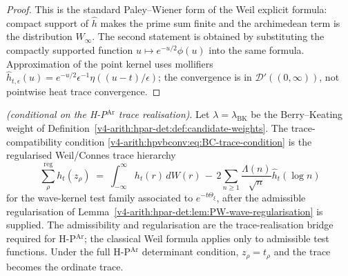 \begin{proof}
This is the standard Paley--Wiener form of the Weil explicit formula:
compact support of \(\widehat h\) makes the prime sum finite and the
archimedean term is the distribution \(W_{\infty}\). The second
statement is obtained by substituting the compactly supported function
\(u\mapsto e^{-u/2}\phi(u)\) into the same formula. Approximation of
the point kernel uses mollifiers
\(\widehat h_{t,\epsilon}(u)=e^{-u/2}\epsilon^{-1}\eta((u-t)/\epsilon)\);
the convergence is in \(\mathcal D'((0,\infty))\), not pointwise heat
trace convergence.
\end{proof}

\begin{theorem}
\label{v4-arith:hpar-det:thm:hierarchy-condition}
\ClaimStatusProvedHere \emph{(conditional on the H-P\(^{\mathrm{Ar}}\)
trace realisation)}. Let \(\lambda=\lambda_{\mathrm{BK}}\) be the
Berry--Keating weight of
Definition~\ref{v4-arith:hpar-det:def:candidate-weights}. The
trace-compatibility condition
\eqref{v4-arith:hpvbconv:eq:BC-trace-condition} is the regularised
Weil/Connes trace hierarchy
\begin{equation}
\label{v4-arith:hpar-det:eq:weil-explicit}
\sum_{\rho}^{\mathrm{reg}}h_{t}(z_{\rho})\;=\;
\int_{-\infty}^{\infty}h_{t}(r)\,dW(r)
\,-\,2\sum_{n\geq 1}\frac{\Lambda(n)}{\sqrt{n}}
\widehat{h}_{t}(\log n)
\end{equation}
for the wave-kernel test family associated to
\(e^{-t\Theta_{\xi}}\), after the admissible regularisation of
Lemma~\ref{v4-arith:hpar-det:lem:PW-wave-regularisation} is supplied. The
admissibility and regularisation are the trace-realisation
bridge required for H-P\(^{\mathrm{Ar}}\); the classical Weil formula
applies only to admissible test functions. Under the full
H-P\(^{\mathrm{Ar}}\) determinant condition, \(z_{\rho}=t_{\rho}\) and
the trace becomes the ordinate trace.
\end{theorem}

